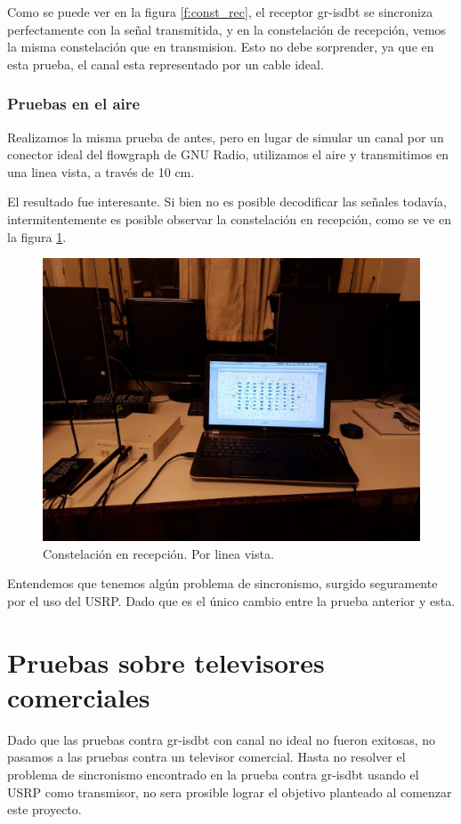 Como se puede ver en la figura \ref{f:const_rec}, el receptor gr-isdbt se sincroniza perfectamente con la señal transmitida, y en la constelación de recepción, vemos la misma constelación que en transmision. Esto no debe sorprender, ya que en esta prueba, el canal esta representado por un cable ideal. 

\subsubsection{Pruebas en el aire}

Realizamos la misma prueba de antes, pero en lugar de simular un canal por un conector ideal del flowgraph de GNU Radio, utilizamos el aire y transmitimos en una linea vista, a través de 10 cm. 

El resultado fue interesante. Si bien no es posible decodificar las señales todavía, intermitentemente es posible observar la constelación en recepción, como se ve en la figura \ref{f:aire}. 

\begin{figure}[!h]
	\centering
	\includegraphics[scale=0.25]{figuras/cap06/aire}
	\caption{\label{f:aire} Constelación en recepción. Por linea vista.}
\end{figure}

Entendemos que tenemos algún problema de sincronismo, surgido seguramente por el uso del USRP. Dado que es el único cambio entre la prueba anterior y esta. 

\section{Pruebas sobre televisores comerciales}

Dado que las pruebas contra gr-isdbt con canal no ideal no fueron exitosas, no pasamos a las pruebas contra un televisor comercial. Hasta no resolver el problema de sincronismo encontrado en la prueba contra gr-isdbt usando el USRP como transmisor, no sera prosible lograr el objetivo planteado al comenzar este proyecto. 